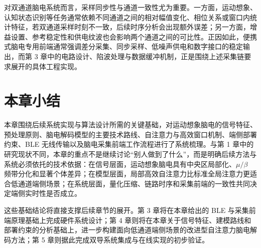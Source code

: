 对双通道脑电系统而言，采样同步性与通道一致性尤为重要。一方面，运动想象、认知状态识别等任务通常依赖不同通道之间的相对幅值变化、相位关系或窗口内统计特征，若双通道采样时刻不一致，后续时序分析会出现额外误差；另一方面，增益设置、参考稳定性和供电纹波也会影响两个通道之间的可比性。正因如此，便携式脑电专用前端通常强调差分采集、同步采样、低噪声供电和数字接口的稳定输出，而第 3 章中的电路设计、陷波处理与数据缓冲机制，正是围绕上述采集链要求展开的具体工程实现。

\section{本章小结}

本章围绕后续系统实现与算法设计所需的关键基础，对运动想象脑电的信号特征、预处理原则、脑电解码模型的主要技术路线、自注意力与高效窗口机制、端侧部署约束、BLE 无线传输以及脑电采集前端工作流程进行了系统梳理。与第 1 章中的研究现状不同，本章的重点不是继续讨论“别人做到了什么”，而是明确后续方法与系统必须依托的技术依据：在信号层面，运动想象脑电具有中央区局部化、$\mu/\beta$ 频带分化和显著个体差异；在模型层面，局部高效自注意力比标准全局注意力更适合低通道端侧场景；在系统层面，量化压缩、链路时序和采集前端的一致性共同决定端侧实时性是否成立。

这些基础结论将直接支撑后续章节的展开。第 3 章将在本章给出的 BLE 与采集前端原理基础上完成硬件系统设计；第 4 章则将在本章关于信号特征、建模路线和部署约束的分析基础上，进一步构建面向低通道端侧场景的改进型自注意力脑电解码方法；第 5 章则据此完成双导系统集成与在线实现的初步验证。
